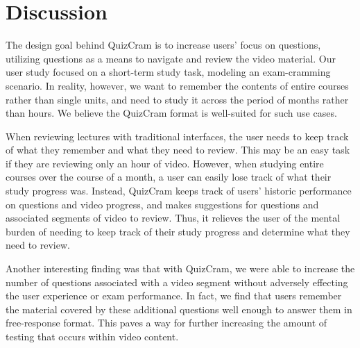 \documentclass{chi-ext}
\begin{document}
\section{Discussion}

The design goal behind QuizCram is to increase users' focus on questions, utilizing questions as a means to navigate and review the video material. Our user study focused on a short-term study task, modeling an exam-cramming scenario. In reality, however, we want to remember the contents of entire courses rather than single units, and need to study it across the period of months rather than hours. We believe the QuizCram format is well-suited for such use cases.

When reviewing lectures with traditional interfaces, the user needs to keep track of what they remember and what they need to review. This may be an easy task if they are reviewing only an hour of video. However, when studying entire courses over the course of a month, a user can easily lose track of what their study progress was. Instead, QuizCram keeps track of users' historic performance on questions and video progress, and makes suggestions for questions and associated segments of video to review. Thus, it relieves the user of the mental burden of needing to keep track of their study progress and determine what they need to review.

Another interesting finding was that with QuizCram, we were able to increase the number of questions associated with a video segment without adversely effecting the user experience or exam performance. In fact, we find that users remember the material covered by these additional questions well enough to answer them in free-response format. This paves a way for further increasing the amount of testing that occurs within video content.
\end{document}
